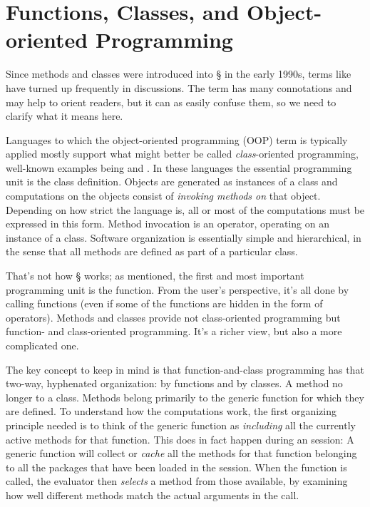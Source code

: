 \documentclass[11pt]{article}
\begin{document}
\section{Functions, Classes, and Object-oriented Programming}
\label{sec:funct-class-object}

Since methods and classes were introduced into \S{} in the early 1990s, terms like  have turned up frequently in discussions.
The term has many connotations and may help to orient readers, but it can as easily confuse them, so we need to clarify what it means here.

Languages to which the object-oriented programming (OOP) term is typically applied mostly support what might better be called \emph{class}-oriented programming, well-known examples being \Cpp{} and \Java{}.
In these languages the essential programming unit is the class definition.
Objects are generated as instances of a class and computations on the objects consist of \emph{invoking methods on}  that object.
Depending on how strict the language is, all or most of the computations must be expressed in this form.
Method invocation is an operator, operating on an instance of a class.
Software organization is essentially simple and  hierarchical, in the sense that all methods are defined as part of a particular class.

That's not how \S{} works; as mentioned, the first and most important programming unit is the function.
From the user's perspective, it's all done by calling functions (even if some of the functions are hidden in the form of operators).
Methods and classes provide not class-oriented programming but function- and class-oriented programming.
It's a richer view, but also a  more complicated one.

The key concept to keep in mind is that function-and-class programming has that two-way,  hyphenated organization:  by functions and by classes.
A method no longer  to a class.
Methods belong primarily to the generic function for which they are defined.
To understand how the computations work, the first organizing principle needed is to think of the generic function as \emph{including} all the currently active methods for that function.
This does in fact happen during an \R{} session:  A generic function will collect or \emph{cache} all the methods for that function belonging to all the \R{} packages that have been loaded in the session.
When the function is called, the \R{} evaluator then \emph{selects} a method from those available, by examining how well different methods match the actual arguments in the call.
\end{document}
